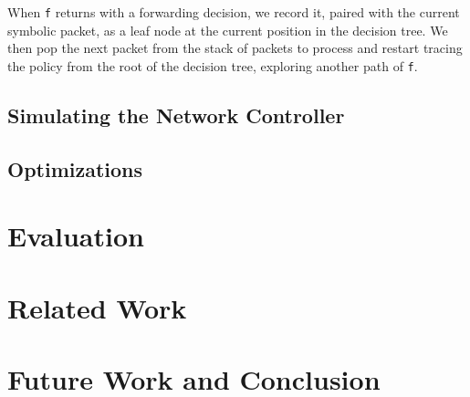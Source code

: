 \documentclass[12pt]{article}
\begin{document}
When \lstinline|f| returns with a forwarding decision, we record it, paired with the current symbolic packet, as a leaf node at the current position in the decision tree. We then pop the next packet from the stack of packets to process and restart tracing the policy from the root of the decision tree, exploring another path of \lstinline|f|.  


\subsection*{Simulating the Network Controller}



\subsection*{Optimizations}


\section*{Evaluation}


\section*{Related Work}


\section*{Future Work and Conclusion}




\end{document}
